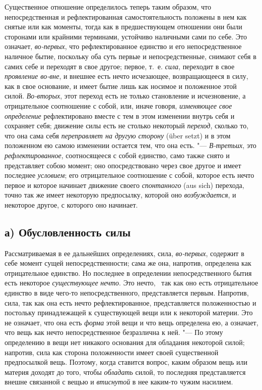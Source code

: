 Существенное отношение определилось теперь таким образом, что
непосредственная и рефлектированная самостоятельность положены в
нем
как снятые или как моменты, тогда как в предшествующем отношении они были
сторонами или крайними терминами, устойчиво наличными сами по себе. Это
означает, {\em во-первых}, что рефлектированное
единство и его непосредственное наличное бытие, поскольку оба суть первые и
непосредственные, снимают себя в самих себе и переходят в свое другое;
первое, т.~е. {\em сила}, переходит в свое
{\em проявление во-вне}, и внешнее есть нечто
исчезающее, возвращающееся в силу, как в свое основание, и имеет бытие лишь
как носимое и положенное этой силой. {\em Во-вторых},
этот переход есть не только становление и исчезновение, а отрицательное
соотношение с собой, или, иначе говоря, {\em изменяющее
свое определение} рефлектировано вместе с тем в этом изменении внутрь себя
и сохраняет себя; движение силы есть не столько некоторый
{\em переход}, сколько то, что она сама себя
{\em переправляет на другую сторону} (über setzt) и в
этом положенном ею самою изменении остается тем, что она есть. "---
{\em В-третьих}, это {\em рефлектированное}, соотносящееся с собой единство,
само также снято и представляет собою момент; оно опосредствовано через
свое другое и имеет последнее {\em условием}; его
отрицательное соотношение с собой, которое есть нечто первое и которое
начинает движение своего {\em спонтанного} (aus sich) перехода,
точно так же имеет некоторую предпосылку, которой оно
{\em возбуждается}, и некоторое другое, с которого оно начинает.


\subsection[а) Обусловленность силы]{а) Обусловленность силы}

Рассматриваемая в ее дальнейших определениях,
сила, {\em во-первых}, содержит в себе момент сущей
непосредственности; сама же она, напротив, определена как отрицательное
единство. Но последнее в определении непосредственного бытия есть некоторое
{\em существующее} {\em нечто}. Это
нечто, \ так как оно есть отрицательное единство в виде чего-то
непосредственного, представляется первым. Напротив, сила, так как она есть
нечто рефлектированное, представляется положенностью и постольку
принадлежащей к существующей вещи или к некоторой материи. Это не означает,
что она есть {\em форма} этой вещи и что вещь
определена ею, а означает, что вещь как нечто непосредственное безразлична
к ней. "--- По этому определению в вещи нет никакого основания для обладания
некоторой силой; напротив, сила как сторона положенности имеет своей
существенной предпосылкой вещь. Поэтому, когда ставится вопрос, каким
образом вещь или материя доходят до того, чтобы
{\em обладать} силой, то последняя представляется
внешне связанной с вещью и {\em втиснутой} в нее
каким-то чужим насилием.

